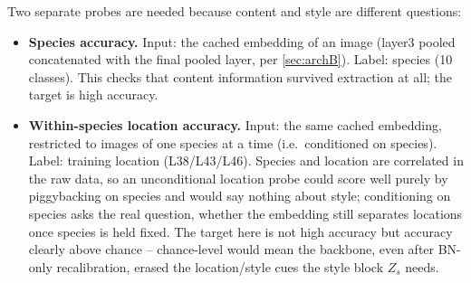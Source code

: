 Two separate probes are needed because content and style are different questions:
\begin{itemize}[leftmargin=1.5em]
\item \textbf{Species accuracy.} Input: the cached embedding of an image (layer3 pooled concatenated
      with the final pooled layer, per \cref{sec:archB}). Label: species (10 classes). This checks that
      content information survived extraction at all; the target is high accuracy.
\item \textbf{Within-species location accuracy.} Input: the same cached embedding, restricted to images
      of one species at a time (i.e.\ conditioned on species). Label: training location
      (L38/L43/L46). Species and location are correlated in the raw data, so an unconditional
      location probe could score well purely by piggybacking on species and would say nothing about
      style; conditioning on species asks the real question, whether the embedding still separates
      locations once species is held fixed. The target here is not high accuracy but accuracy clearly
      above chance -- chance-level would mean the backbone, even after BN-only recalibration, erased
      the location/style cues the style block $Z_s$ needs.
\end{itemize}

